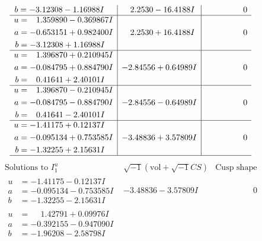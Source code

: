 \documentclass[1p]{elsarticle_modified}
\theoremstyle{definition}
\newcommand{\I}{\sqrt{-1}}
\begin{document}
$$\begin{array}{c|c|c}
\begin{aligned}
b &= -3.12308 - 1.16988 I\end{aligned}
 & \phantom{-}2.2530 - 16.4188 I & \phantom{-0.000000 } 0 \\ \hline\begin{aligned}
u &= \phantom{-}1.359890 - 0.369867 I \\
a &= -0.653151 + 0.982400 I \\
b &= -3.12308 + 1.16988 I\end{aligned}
 & \phantom{-}2.2530 + 16.4188 I & \phantom{-0.000000 } 0 \\ \hline\begin{aligned}
u &= \phantom{-}1.396870 + 0.210945 I \\
a &= -0.084795 + 0.884790 I \\
b &= \phantom{-}0.41641 + 2.40101 I\end{aligned}
 & -2.84556 + 0.64989 I & \phantom{-0.000000 } 0 \\ \hline\begin{aligned}
u &= \phantom{-}1.396870 - 0.210945 I \\
a &= -0.084795 - 0.884790 I \\
b &= \phantom{-}0.41641 - 2.40101 I\end{aligned}
 & -2.84556 - 0.64989 I & \phantom{-0.000000 } 0 \\ \hline\begin{aligned}
u &= -1.41175 + 0.12137 I \\
a &= -0.095134 + 0.753585 I \\
b &= -1.32255 + 2.15631 I\end{aligned}
 & -3.48836 + 3.57809 I & \phantom{-0.000000 } 0\\
 \hline 
 \end{array}$$\newpage$$\begin{array}{c|c|c}  
\text{Solutions to }I^u_{1}& \I (\text{vol} + \sqrt{-1}CS) & \text{Cusp shape}\\
 \hline 
\begin{aligned}
u &= -1.41175 - 0.12137 I \\
a &= -0.095134 - 0.753585 I \\
b &= -1.32255 - 2.15631 I\end{aligned}
 & -3.48836 - 3.57809 I & \phantom{-0.000000 } 0 \\ \hline\begin{aligned}
u &= \phantom{-}1.42791 + 0.09976 I \\
a &= -0.392155 - 0.947090 I \\
b &= -1.96208 - 2.58798 I\end{aligned}

\end{array}$$
\end{document}
